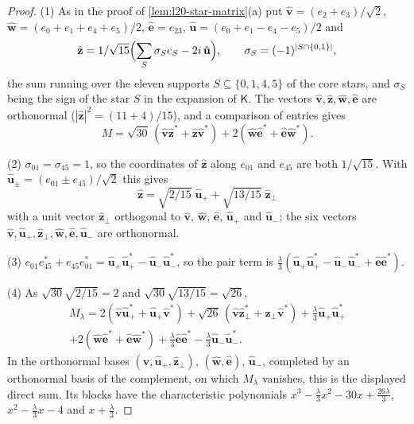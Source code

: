 \begin{proof}
(1) As in the proof of \cref{lem:l20-star-matrix}(a) put
$\hat{\mathbf v}=(e_2+e_3)/\sqrt2$, $\hat{\mathbf w}=(e_0+e_1+e_4+e_5)/2$,
$\hat{\mathbf e}=e_{23}$, $\hat{\mathbf u}=(e_0+e_1-e_4-e_5)/2$ and
\[
 \hat{\mathbf z}=\frac1{\sqrt{15}}\Bigl(\sum_S\sigma_Se_S-2i\,\hat{\mathbf u}\Bigr),\qquad
 \sigma_S=(-1)^{|S\cap\{0,1\}|},
\]
the sum running over the eleven supports $S\subseteq\{0,1,4,5\}$ of the core stars, and
$\sigma_S$ being the sign of the star $S$ in the expansion of $\mathsf K$. The vectors
$\hat{\mathbf v},\hat{\mathbf z},\hat{\mathbf w},\hat{\mathbf e}$ are orthonormal
($|\hat{\mathbf z}|^2=(11+4)/15$), and a comparison of entries gives
\[
 M=\sqrt{30}\,(\hat{\mathbf v}\hat{\mathbf z}^*+\hat{\mathbf z}\hat{\mathbf v}^*)
 +2(\hat{\mathbf w}\hat{\mathbf e}^*+\hat{\mathbf e}\hat{\mathbf w}^*).
\]

(2) $\sigma_{01}=\sigma_{45}=1$, so the coordinates of $\hat{\mathbf z}$ along $e_{01}$ and $e_{45}$
are both $1/\sqrt{15}$. With $\hat{\mathbf u}_\pm=(e_{01}\pm e_{45})/\sqrt2$ this gives
\[
 \hat{\mathbf z}=\sqrt{2/15}\;\hat{\mathbf u}_++\sqrt{13/15}\;\hat{\mathbf z}_\perp
\]
with a unit vector $\hat{\mathbf z}_\perp$ orthogonal to $\hat{\mathbf v}$, $\hat{\mathbf w}$,
$\hat{\mathbf e}$, $\hat{\mathbf u}_+$ and $\hat{\mathbf u}_-$; the six vectors
$\hat{\mathbf v},\hat{\mathbf u}_+,\hat{\mathbf z}_\perp,\hat{\mathbf w},\hat{\mathbf e},
\hat{\mathbf u}_-$ are orthonormal.

(3) $e_{01}e_{45}^*+e_{45}e_{01}^*=\hat{\mathbf u}_+\hat{\mathbf u}_+^*-\hat{\mathbf u}_-\hat{\mathbf u}_-^*$, so the
pair term is $\frac\lambda3(\hat{\mathbf u}_+\hat{\mathbf u}_+^*-\hat{\mathbf u}_-\hat{\mathbf u}_-^*+\hat{\mathbf e}\hat{\mathbf e}^*)$.

(4) As $\sqrt{30}\sqrt{2/15}=2$ and $\sqrt{30}\sqrt{13/15}=\sqrt{26}$,
\begin{multline*}
 M_\lambda=2(\hat{\mathbf v}\hat{\mathbf u}_+^*+\hat{\mathbf u}_+\hat{\mathbf v}^*)
 +\sqrt{26}\,(\hat{\mathbf v}\hat{\mathbf z}_\perp^*+\hat{\mathbf z}_\perp\hat{\mathbf v}^*)
 +\tfrac\lambda3\hat{\mathbf u}_+\hat{\mathbf u}_+^*\\
 +2(\hat{\mathbf w}\hat{\mathbf e}^*+\hat{\mathbf e}\hat{\mathbf w}^*)+\tfrac\lambda3\hat{\mathbf e}\hat{\mathbf e}^*
 -\tfrac\lambda3\hat{\mathbf u}_-\hat{\mathbf u}_-^*.
\end{multline*}
In the orthonormal bases $(\hat{\mathbf v},\hat{\mathbf u}_+,\hat{\mathbf z}_\perp)$, $(\hat{\mathbf w},\hat{\mathbf e})$,
$\hat{\mathbf u}_-$, completed by an orthonormal basis of the complement, on which $M_\lambda$
vanishes, this is the displayed direct sum. Its blocks have the characteristic
polynomials $x^3-\frac\lambda3x^2-30x+\frac{26\lambda}3$, $x^2-\frac\lambda3x-4$ and
$x+\frac\lambda3$.


\end{proof}
